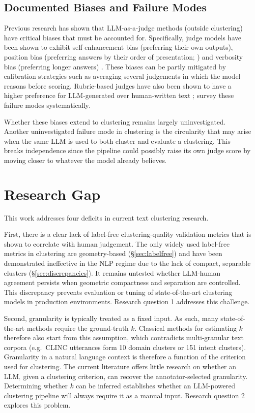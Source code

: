 \documentclass[11pt,a4paper,oneside]{report}
\begin{document}
\subsection{Documented Biases and Failure Modes}\label{sec:judgebiases}

Previous research has shown that LLM-as-a-judge methods (outside clustering) have critical biases that must be accounted for. Specifically, judge models have been shown to exhibit self-enhancement bias (preferring their own outputs), position bias (preferring answers by their order of presentation; \citealp{wang2024fair}) and verbosity bias (preferring longer answers) \citep{zheng2023judging}. These biases can be partly mitigated by calibration strategies such as averaging several judgements in which the model reasons before scoring. Rubric-based judges have also been shown to have a higher preference for LLM-generated over human-written text \citep{liu2023geval}; \citet{gu2024judgesurvey} survey these failure modes systematically.

Whether these biases extend to clustering remains largely uninvestigated. Another uninvestigated failure mode in clustering is the circularity that may arise when the same LLM is used to both cluster and evaluate a clustering. This breaks independence since the pipeline could possibly raise its own judge score by moving closer to whatever the model already believes.

\section{Research Gap}\label{sec:gap}

This work addresses four deficits in current text clustering research.

First, there is a clear lack of label-free clustering-quality validation metrics that is shown to correlate with human judgement. The only widely used label-free metrics in clustering are geometry-based (\S\ref{sec:labelfree}) and have been demonstrated ineffective in the NLP regime due to the lack of compact, separable clusters (\S\ref{sec:discrepancies}). It remains untested whether LLM-human agreement persists when geometric compactness and separation are controlled. This discrepancy prevents evaluation or tuning of state-of-the-art clustering models in production environments. Research question 1 addresses this challenge.

Second, granularity is typically treated as a fixed input. As such, many state-of-the-art methods require the ground-truth $k$. Classical methods for estimating $k$ therefore also start from this assumption, which contradicts multi-granular text corpora (e.g.\ CLINC utterances form 10 domain clusters or 151 intent clusters). Granularity in a natural language context is therefore a function of the criterion used for clustering. The current literature offers little research on whether an LLM, given a clustering criterion, can recover the annotator-selected granularity. Determining whether $k$ can be inferred establishes whether an LLM-powered clustering pipeline will always require it as a manual input. Research question 2 explores this problem.
\end{document}
